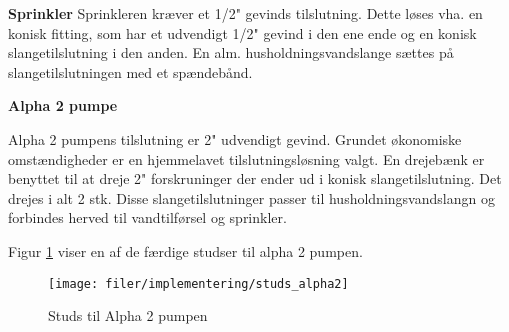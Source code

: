 
\textbf{Sprinkler}
Sprinkleren kræver et 1/2" gevinds tilslutning. Dette løses vha. en konisk fitting, som har et udvendigt 1/2" gevind i den ene ende og en konisk slangetilslutning i den anden. En alm. husholdningsvandslange sættes på slangetilslutningen med et spændebånd. 

\textbf{Alpha 2 pumpe}

Alpha 2 pumpens tilslutning er 2" udvendigt gevind. Grundet økonomiske omstændigheder er en hjemmelavet tilslutningsløsning valgt. En drejebænk er benyttet til at dreje 2" forskruninger der ender ud i konisk slangetilslutning. Det drejes i alt 2 stk. Disse slangetilslutninger passer til husholdningsvandslangn og forbindes herved til vandtilførsel og sprinkler.

Figur \ref{lab:fitting_alpha2} viser en af de færdige studser til alpha 2 pumpen. 

\begin{figure}[htb]
\centering
{\texttt{[image: filer/implementering/studs\_alpha2]}}
\caption{Studs til Alpha 2 pumpen}
\label{lab:fitting_alpha2}
\end{figure}


